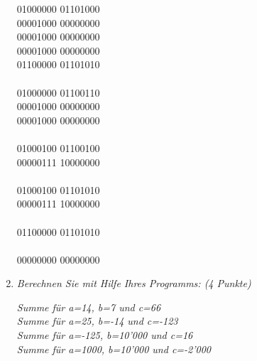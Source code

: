 \documentclass[10pt]{article}
\begin{document}
\begin{enumerate}[label=\alph*)]
			01000000 01101000 \\
			00001000 00000000 \\
			00001000 00000000 \\
			00001000 00000000 \\
			01100000 01101010 \\
			\\
			01000000 01100110 \\
			00001000 00000000 \\
			00001000 00000000 \\
			\\
			01000100 01100100 \\ %
			00000111 10000000 \\
			\\
			01000100 01101010 \\ %
			00000111 10000000 \\
			\\
			01100000 01101010 \\
			\\
			00000000 00000000
			
			
	\item
			\textit{Berechnen Sie mit Hilfe Ihres Programms: (4 Punkte)}
			
			\textit{Summe für a=14, b=7 und c=66}\\
			
			
			\textit{Summe für a=25, b=-14 und c=-123}\\
			
			
			\textit{Summe für a=-125, b=10’000 und c=16}\\
			
			
			\textit{Summe für a=1000, b=10’000 und c=-2’000}\\
			
			
\end{enumerate}
\end{document}
